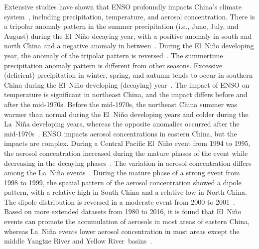 \documentclass[atmosphere,article,accept,pdftex,moreauthors]{Definitions/mdpi}
\begin{document}
Extensive studies have shown that ENSO profoundly impacts China's climate system~\cite{huang1989AAS, wu2009JC, chen2012CJOL}, including precipitation, temperature, and aerosol concentration. There is a tripolar anomaly pattern in the summer precipitation (i.e., June, July, and August) during the El~Niño decaying year, with a positive anomaly in south and north China and a negative anomaly in between~\cite{huang1989AAS, huang2012AAS}. During the El~Niño developing year, the anomaly of the tripolar pattern is reversed~\cite{duan2023JC}. The summertime precipitation anomaly pattern is different from other seasons. Excessive (deficient) precipitation in winter, spring, and autumn tends to occur in southern China during the El~Niño developing (decaying) year~\cite{zhang1999AAS}. The impact of ENSO on temperature is significant in northeast China, and the impact differs before and after the mid-1970s. Before the mid-1970s, the northeast China summer was warmer than normal during the El~Niño developing years and colder during the La~Niña developing years, whereas the opposite anomalies occurred after the mid-1970s~\cite{wu2010JGRA}. ENSO impacts aerosol concentrations in eastern China, but the impacts are complex. During a Central Pacific El~Niño event from 1994 to 1995, the aerosol concentration increased during the mature phases of the event while decreasing in the decaying phases~\cite{feng2016JGRA}. The variation in aerosol concentration differs among the La~Niña events~\cite{feng2017JGRA}. During the mature phase of a strong event from 1998 to 1999, the spatial pattern of the aerosol concentration showed a dipole pattern, with a relative high in South China and a relative low in North China. The dipole distribution is reversed in a moderate event from 2000 to 2001~\cite{feng2017JGRA}. Based on more extended datasets from 1980 to 2016, it is found that El~Niño events can promote the accumulation of aerosols in most areas of eastern China, whereas La~Niña events lower aerosol concentration in most areas except the middle Yangtze River and Yellow \mbox{River basins~\cite{sun2018JGRA}}.
\end{document}
